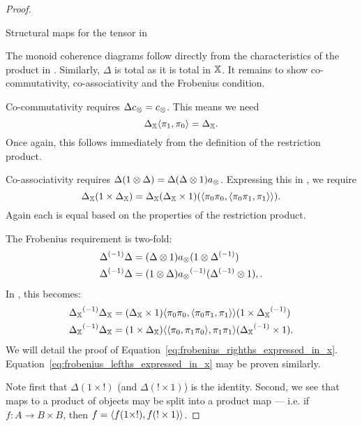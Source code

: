 \begin{proof}
\begin{table}[h!]
\begin{center}
    \end{center}
    \caption{Structural maps for the tensor in \Invc{\X}}
    \label{tab:structural_maps_for_the_tensor_in_invx}
  \end{table}

  The monoid coherence diagrams follow directly from the characteristics of the product in
  \X. Similarly, $\Delta$ is total as it is total in $\mathbb{X}$. It remains to show co-commutativity,
  co-associativity and the Frobenius condition.

  Co-commutativity requires $\Delta c_{\otimes} = c_{\otimes}$. This means we need
  \[\Delta_{\mathbb{X}} \langle \pi_1,\pi_0\rangle = \Delta_{\mathbb{X}}.\] Once again, this follows immediately from the
  definition of the restriction product.

  Co-associativity requires $\Delta (1 \otimes \Delta) = \Delta (\Delta \otimes 1) a_{\otimes}$. Expressing this
  in \X, we require
  \[
    \Delta_{\mathbb{X}} (1 \times \Delta_{\mathbb{X}}) =
      \Delta_{\mathbb{X}}(\Delta_{\mathbb{X}} \times 1) (\langle\pi_0 \pi_0,\langle\pi_0 \pi_1,\pi_1\rangle\rangle).
  \]
  Again each is equal based on the properties of the restriction product.

  The Frobenius requirement is two-fold:
  \begin{align}
    {\Delta}^{(-1)} \Delta &= (\Delta \otimes1) a_{\otimes}(1\otimes{\Delta}^{(-1)}) \label{eq:frobenius_righths_need_in_invx}\\
    {\Delta}^{(-1)} \Delta &= (1 \otimes \Delta) {a_{\otimes}}^{(-1)}({\Delta}^{(-1)}\otimes 1), \label{eq:frobenius_lefths_need_in_invx}.
  \end{align}
  In \X, this becomes:
  \begin{align}
    {\Delta_{\ensuremath{\mathbb{X}}}}^{(-1)} \Delta_{\mathbb{X}}
      &= (\Delta_{\mathbb{X}} \times 1) \langle\pi_0 \pi_0,\langle\pi_0 \pi_1,\pi_1\rangle\rangle(1\times{\Delta_{\ensuremath{\mathbb{X}}}}^{(-1)})
      \label{eq:frobenius_righths_expressed_in_x}\\
    {\Delta_{\mathbb{X}}}^{(-1)}\Delta_{\mathbb{X}}
      &= (1 \times \Delta_{\mathbb{X}}) \langle\langle\pi_0, \pi_1 \pi_0\rangle,\pi_1 \pi_1\rangle({\Delta_{\mathbb{X}}}^{(-1)}\times 1).
      \label{eq:frobenius_lefths_expressed_in_x}
  \end{align}
  We will detail the proof of Equation~\ref{eq:frobenius_righths_expressed_in_x}.
  Equation~\ref{eq:frobenius_lefths_expressed_in_x} may be proven similarly.

  Note first that $\Delta(1 \times !)$ (and $\Delta(!\times 1)$) is the identity. Second, we see
  that maps to a product of objects may be split into a product map --- i.e.  if
  $f:A \to B \times B$, then $f = \langle f(1\times !), f(!\times 1)\rangle$.


\end{proof}
